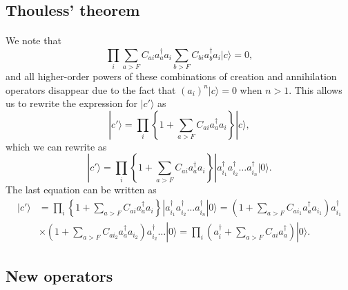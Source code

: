 \documentclass[%
twoside,                 %
final,                   %
10pt]{article}
\begin{document}
\subsection*{Thouless' theorem}

\paragraph{}

We note that
\[
\prod_{i}\sum_{a>F}C_{ai}a_{a}^{\dagger}a_{i}\sum_{b>F}C_{bi}a_{b}^{\dagger}a_{i}| c\rangle =0,
\]
and all higher-order powers of these combinations of creation and annihilation operators disappear 
due to the fact that $(a_i)^n| c\rangle =0$ when $n > 1$. This allows us to rewrite the expression for $|c'\rangle $ as
\[
|c'\rangle=\prod_{i}\left\{1+\sum_{a>F}C_{ai}a_{a}^{\dagger}a_{i}\right\}| c\rangle,
\]
which we can rewrite as 
\[
|c'\rangle=\prod_{i}\left\{1+\sum_{a>F}C_{ai}a_{a}^{\dagger}a_{i}\right\}| a^{\dagger}_{i_1} a^{\dagger}_{i_2} \dots a^{\dagger}_{i_n}|0\rangle.
\]
The last equation can be written as
\begin{align}
|c'\rangle&=\prod_{i}\left\{1+\sum_{a>F}C_{ai}a_{a}^{\dagger}a_{i}\right\}| a^{\dagger}_{i_1} a^{\dagger}_{i_2} \dots a^{\dagger}_{i_n}|0\rangle=\left(1+\sum_{a>F}C_{ai_1}a_{a}^{\dagger}a_{i_1}\right)a^{\dagger}_{i_1} \\
& \times\left(1+\sum_{a>F}C_{ai_2}a_{a}^{\dagger}a_{i_2}\right)a^{\dagger}_{i_2} \dots |0\rangle=\prod_{i}\left(a^{\dagger}_{i}+\sum_{a>F}C_{ai}a_{a}^{\dagger}\right)|0\rangle.
\end{align}



\subsection*{New operators}

\paragraph{}
\end{document}

